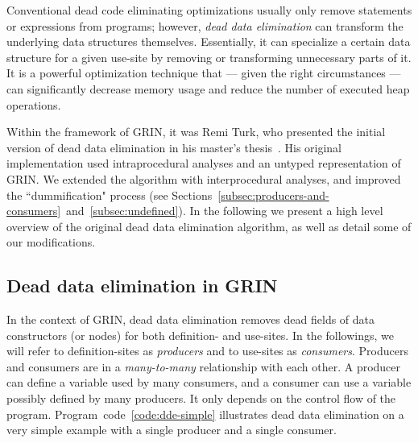 \documentclass[main.tex]{subfiles}
\begin{document}
	
	
	Conventional dead code eliminating optimizations usually only remove statements or expressions from programs; however, \emph{dead data elimination} can transform the underlying data structures themselves. Essentially, it can specialize a certain data structure for a given use-site by removing or transforming unnecessary parts of it. It is a powerful optimization technique that --- given the right circumstances --- can significantly decrease memory usage and reduce the number of executed heap operations.
	
	Within the framework of GRIN, it was Remi Turk, who presented the initial version of dead data elimination in his master's thesis~\cite{remi-masters}. His original implementation used intraprocedural analyses and an untyped representation of GRIN. We extended the algorithm with interprocedural analyses, and improved the ``dummification" process (see Sections~\ref{subsec:producers-and-consumers}~and~\ref{subsec:undefined}). In the following we present a high level overview of the original dead data elimination algorithm, as well as detail some of our modifications.
	
	\subsection{Dead data elimination in GRIN}
	
	In the context of GRIN, dead data elimination removes dead fields of data constructors (or nodes) for both definition- and use-sites. In the followings, we will refer to definition-sites as \emph{producers} and to use-sites as \emph{consumers}. Producers and consumers are in a \emph{many-to-many} relationship with each other. A producer can define a variable used by many consumers, and a consumer can use a variable possibly defined by many producers. It only depends on the control flow of the program. Program~code~\ref{code:dde-simple} illustrates dead data elimination on a very simple example with a single producer and a single consumer.
	
\end{document}
